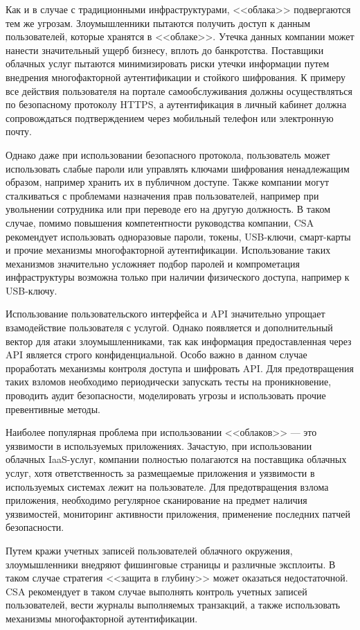 Как и в случае с традиционными инфраструктурами, <<облака>> подвергаются тем же угрозам.
Злоумышленники пытаются получить доступ к данным пользователей, которые хранятся в <<облаке>>.
Утечка данных компании может нанести значительный ущерб бизнесу, вплоть до банкротства.
Поставщики облачных услуг пытаются минимизировать риски утечки информации путем внедрения многофакторной аутентификации и стойкого шифрования.
К примеру все действия пользователя на портале самообслуживания должны осуществляться по безопасному протоколу HTTPS, а аутентификация в личный кабинет должна сопровождаться подтверждением через мобильный телефон или электронную почту.

Однако даже при использовании безопасного протокола, пользователь может использовать слабые пароли или управлять ключами шифрования ненадлежащим образом, например хранить их в публичном доступе.
Также компании могут сталкиваться с проблемами назначения прав пользователей, например при увольнении сотрудника или при переводе его на другую должность.
В таком случае, помимо повышения компетентности руководства компании, CSA рекомендует использовать одноразовые пароли, токены, USB-ключи, смарт-карты и прочие механизмы многофакторной аутентификации.
Использование таких механизмов значительно усложняет подбор паролей и компрометация инфраструктуры возможна только при наличии физического доступа, например к USB-ключу.

Использование пользовательского интерфейса и API значительно упрощает взамодействие пользователя с услугой.
Однако появляется и дополнительный вектор для атаки злоумышленниками, так как информация предоставленная через API является строго конфиденциальной.
Особо важно в данном случае проработать механизмы контроля доступа и шифровать API.
Для предотвращения таких взломов необходимо периодически запускать тесты на проникновение, проводить аудит безопасности, моделировать угрозы и использовать прочие превентивные методы.

Наиболее популярная проблема при использовании <<облаков>> --- это уязвимости в используемых приложениях.
Зачастую, при использовании облачных IaaS-услуг, компании полностью полагаются на поставщика облачных услуг, хотя ответственность за размещаемые приложения и уязвимости в используемых системах лежит на пользователе.
Для предотвращения взлома приложения, необходимо регулярное сканирование на предмет наличия уязвимостей, мониторинг активности приложения, применение последних патчей безопасности.

Путем кражи учетных записей пользователей облачного окружения, злоумышленники внедряют фишинговые страницы и различные эксплоиты.
В таком случае стратегия <<защита в глубину>> может оказаться недостаточной.
CSA рекомендует в таком случае выполнять контроль учетных записей пользователей, вести журналы выполняемых транзакций, а также использовать механизмы многофакторной аутентификации.

